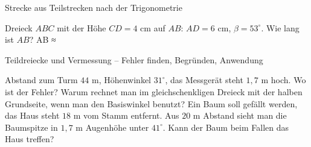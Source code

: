 \begin{aufgabe}{Strecke aus Teilstrecken nach der Trigonometrie}
\begin{teile}
\teil Dreieck $ABC$ mit der Höhe $CD = 4$ cm auf $AB$: $AD = 6$ cm, $\beta = 53^\circ$. Wie lang ist $AB$? AB ≈ \leerfeld[cm]
\end{teile}
\end{aufgabe}

\begin{aufgabe}{Teildreiecke und Vermessung – Fehler finden, Begründen, Anwendung}
\begin{teile}
\teil Abstand zum Turm $44$ m, Höhenwinkel $31^\circ$, das Messgerät steht $1{,}7$ m hoch. Wo ist der Fehler? 
\teil Warum rechnet man im gleichschenkligen Dreieck mit der halben Grundseite, wenn man den Basiswinkel benutzt?
\teil Ein Baum soll gefällt werden, das Haus steht $18$ m vom Stamm entfernt. Aus $20$ m Abstand sieht man die Baumspitze in $1{,}7$ m Augenhöhe unter $41^\circ$. Kann der Baum beim Fallen das Haus treffen?
\end{teile}
\end{aufgabe}
